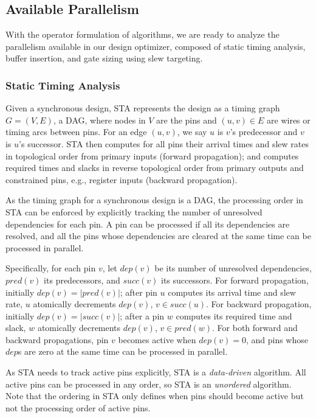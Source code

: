 \subsection{Available Parallelism}
\label{sec:avail_parallelism}

With the operator formulation of algorithms, we are ready to analyze the parallelism available in our design optimizer, composed of static timing analysis, buffer insertion, and gate sizing using slew targeting.

\subsubsection{Static Timing Analysis}
\label{sec:sta_parallel}

Given a synchronous design, STA represents the design as a timing graph $G = (V, E)$, a DAG, where nodes in $V$ are the pins and $(u, v) \in E$ are wires or timing arcs between pins. For an edge $(u, v)$, we say $u$ is $v$'s predecessor and $v$ is $u$'s successor. STA then computes for all pins their arrival times and slew rates in topological order from primary inputs (forward propagation); and computes required times and slacks in reverse topological order from primary outputs and constrained pins, e.g., register inputs (backward propagation).

As the timing graph for a synchronous design is a DAG, the processing order in STA can be enforced by explicitly tracking the number of unresolved dependencies for each pin. A pin can be processed if all its dependencies are resolved, and all the pins whose dependencies are cleared at the same time can be processed in parallel.

Specifically, for each pin $v$, let $dep(v)$ be its number of unresolved dependencies, $pred(v)$ its predecessors, and $succ(v)$ its successors. For forward propagation, initially $dep(v) = |pred(v)|$; after pin $u$ computes its arrival time and slew rate, $u$ atomically decrements $dep(v)$, $v \in succ(u)$. For backward propagation, initially $dep(v) = |succ(v)|$; after a pin $w$ computes its required time and slack, $w$ atomically decrements $dep(v)$, $v \in pred(w)$. For both forward and backward propagations, pin $v$ becomes active when $dep(v) = 0$, and pins whose $dep$s are zero at the same time can be processed in parallel.

As STA needs to track active pins explicitly, STA is a {\em data-driven} algorithm. All active pins can be processed in any order, so STA is an {\em unordered} algorithm. Note that the ordering in STA only defines when pins should become active but not the processing order of active pins.

